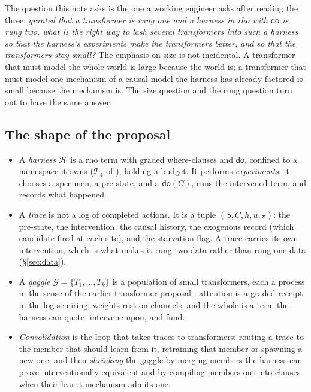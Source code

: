 \documentclass[11pt]{article}
\theoremstyle{plain}
\theoremstyle{definition}
\theoremstyle{remark}
\newcommand{\dok}{\textsf{do}}
\newcommand{\gag}{\mathcal{G}}
\newcommand{\Har}{\mathcal{H}}
\begin{document}
The question this note asks is the one a working engineer asks after reading
the three: \emph{granted that a transformer is rung one and a harness in rho
with $\dok$ is rung two, what is the right way to lash several transformers
into such a harness so that the harness's experiments make the transformers
better, and so that the transformers stay small?} The emphasis on size is not
incidental. A transformer that must model the whole world is large because the
world is; a transformer that must model one mechanism of a causal model the
harness has already factored is small because the mechanism is. The size
question and the rung question turn out to have the same answer.

\subsection{The shape of the proposal}

\begin{itemize}[leftmargin=1.4em,itemsep=3pt]
\item A \emph{harness} $\Har$ is a rho term with graded where-clauses and
$\dok$, confined to a namespace it owns ($\mathcal{T}_4$ of
\cite{Interventions}), holding a budget. It performs \emph{experiments}: it
chooses a specimen, a pre-state, and a $\dok(C)$, runs the intervened term, and
records what happened.
\item A \emph{trace} is not a log of completed actions. It is a tuple
$(S, C, h, u, \star)$: the pre-state, the intervention, the causal history, the
exogenous record (which candidate fired at each site), and the starvation flag.
A trace carries its own intervention, which is what makes it rung-two data
rather than rung-one data (\S\ref{sec:data}).
\item A \emph{gaggle} $\gag = \{T_1, \dots, T_k\}$ is a population of small
transformers, each a process in the sense of the earlier transformer proposal
\cite{TransformerProposal}: attention is a graded receipt in the log semiring,
weights rest on channels, and the whole is a term the harness can quote,
intervene upon, and fund.
\item \emph{Consolidation} is the loop that takes traces to transformers:
routing a trace to the member that should learn from it, retraining that member
or spawning a new one, and then \emph{shrinking} the gaggle by merging members
the harness can prove interventionally equivalent and by compiling members out
into clauses when their learnt mechanism admits one.
\end{itemize}
\end{document}
